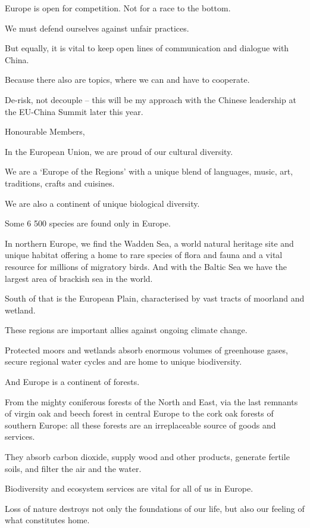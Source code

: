 \documentclass[a4paper,11pt]{article}
\begin{document}
Europe is open for competition. Not for a race to the bottom.

 

We must defend ourselves against unfair practices.

But equally, it is vital to keep open lines of communication and dialogue with China.

Because there also are topics, where we can and have to cooperate.

De-risk, not decouple – this will be my approach with the Chinese leadership at the EU-China Summit later this year. 

 

Honourable Members,

In the European Union, we are proud of our cultural diversity.

We are a ‘Europe of the Regions' with a unique blend of languages, music, art, traditions, crafts and cuisines.

We are also a continent of unique biological diversity.

Some 6 500 species are found only in Europe.

In northern Europe, we find the Wadden Sea, a world natural heritage site and unique habitat offering a home to rare species of flora and fauna and a vital resource for millions of migratory birds. And with the Baltic Sea we have the largest area of brackish sea in the world.

South of that is the European Plain, characterised by vast tracts of moorland and wetland.

These regions are important allies against ongoing climate change.

Protected moors and wetlands absorb enormous volumes of greenhouse gases, secure regional water cycles and are home to unique biodiversity.

And Europe is a continent of forests.

From the mighty coniferous forests of the North and East, via the last remnants of virgin oak and beech forest in central Europe to the cork oak forests of southern Europe: all these forests are an irreplaceable source of goods and services.

They absorb carbon dioxide, supply wood and other products, generate fertile soils, and filter the air and the water.

Biodiversity and ecosystem services are vital for all of us in Europe.

Loss of nature destroys not only the foundations of our life, but also our feeling of what constitutes home.
\end{document}
